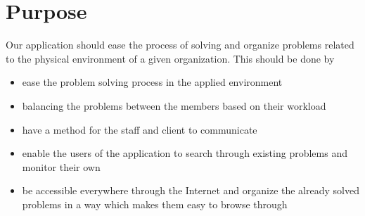 \section{Purpose}
Our application should ease the process of solving and organize problems related to the physical environment of a given organization. This should be done by
\begin{itemize}
\item ease the problem solving process in the applied environment
\item balancing the problems between the \astaff[] members based on their workload%
\item have a method for the staff and client to communicate
\item enable the users of the application to search through existing problems and monitor their own
\item be accessible everywhere through the Internet and organize the already solved problems in a way which makes them easy to browse through
\end{itemize}

